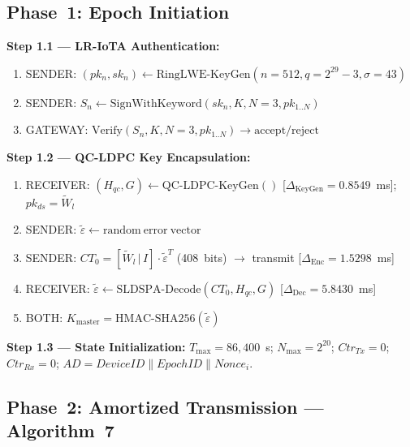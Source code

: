 \documentclass[conference]{IEEEtran}
\newcommand{\Kmaster}{K_{\mathrm{master}}}
\newcommand{\Nmax}{N_{\max}}
\newcommand{\Tmax}{T_{\max}}
\begin{document}
\subsection{Phase~1: Epoch Initiation}

\textbf{Step 1.1 --- LR-IoTA Authentication:}
\begin{enumerate}
  \item SENDER: $(pk_n, sk_n) \leftarrow \mathrm{RingLWE\text{-}KeyGen}(n{=}512, q{=}2^{29}{-}3, \sigma{=}43)$
  \item SENDER: $S_n \leftarrow \mathrm{SignWithKeyword}(sk_n, K, N{=}3, pk_{1..N})$ \quad[$\Delta_{\mathrm{SG}} = 13.299$~ms]
  \item GATEWAY: $\mathrm{Verify}(S_n, K, N{=}3, pk_{1..N}) \to \mathrm{accept/reject}$ \quad[$\Delta_V = 0.735$~ms]
\end{enumerate}

\textbf{Step 1.2 --- QC-LDPC Key Encapsulation:}
\begin{enumerate}
  \item RECEIVER: $(H_{qc}, G) \leftarrow \mathrm{QC\text{-}LDPC\text{-}KeyGen}()$
        [$\Delta_{\mathrm{KeyGen}} = 0.8549$~ms]; $pk_{ds} = \tilde{W}_l$
  \item SENDER: $\tilde{\varepsilon} \leftarrow \mathrm{random\ error\ vector}$
  \item SENDER: $CT_0 = [\tilde{W}_l\,|\,I] \cdot \tilde{\varepsilon}^T$ (408~bits) $\to$ transmit
        [$\Delta_{\mathrm{Enc}} = 1.5298$~ms]
  \item RECEIVER: $\tilde{\varepsilon} \leftarrow \mathrm{SLDSPA\text{-}Decode}(CT_0, H_{qc}, G)$
        [$\Delta_{\mathrm{Dec}} = 5.8430$~ms]
  \item BOTH: $\Kmaster = \mathrm{HMAC\text{-}SHA256}(\tilde{\varepsilon})$ 
\end{enumerate}

\textbf{Step 1.3 --- State Initialization:}
$\Tmax = 86{,}400$~s; $\Nmax = 2^{20}$; $\mathit{Ctr}_{Tx} = 0$;
$\mathit{Ctr}_{Rx} = 0$;
$AD = \mathit{DeviceID} \| \mathit{EpochID} \| \mathit{Nonce}_i$.

\subsection{Phase~2: Amortized Transmission --- Algorithm~7}
\end{document}
